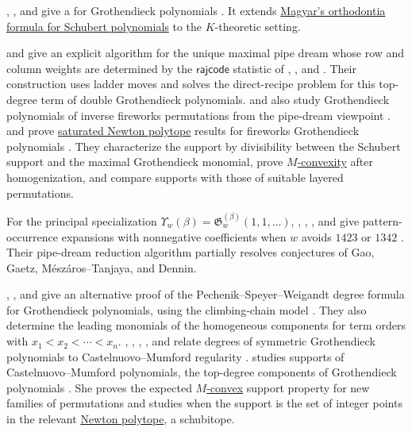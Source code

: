 , , and
 give a
\label{grothendieckOrthodontia}
for Grothendieck polynomials \cite{MeszarosSetiabrataDizier2020x}.  It extends
\hyperref[schubertOrthodontia]{Magyar's orthodontia formula for Schubert
polynomials} to the $K$-theoretic setting.

 and  give an explicit algorithm for the
unique maximal pipe dream whose row and column weights are determined by the
$\mathsf{rajcode}$ statistic of ,
, and  \cite{ChouYu2023x}.  Their
construction uses ladder moves and solves the direct-recipe problem for this
top-degree term of double Grothendieck polynomials.
 and  also study Grothendieck polynomials
of inverse fireworks permutations from the pipe-dream viewpoint
\cite{ChouYu2024x}.
 and  prove
\hyperref[newtonPolytope]{saturated Newton polytope} results for fireworks
Grothendieck polynomials \cite{ChouSetiabrata2025x}.
They characterize the support by divisibility between the Schubert support and
the maximal Grothendieck monomial, prove
\hyperref[MConvexity]{$M$-convexity} after homogenization,
and compare supports with those of suitable layered permutations.

For the principal specialization
$\Upsilon_w(\beta)=\mathfrak G_w^{(\beta)}(1,1,\dotsc)$,
, , , and
 give pattern-occurrence expansions with nonnegative
coefficients when $w$ avoids $1423$ or $1342$ \cite{BaiGuGuoLiu2026x}.
Their pipe-dream reduction algorithm partially resolves conjectures of Gao,
Gaetz, Mészáros--Tanjaya, and Dennin.

, , and
 give an alternative proof of the
Pechenik--Speyer--Weigandt degree formula for Grothendieck polynomials, using
the climbing-chain model \cite{DreyerMeszarosDizier2024}.  They also determine
the leading monomials of the homogeneous components for term orders with
$x_1 < x_2 < \dotsb < x_n$.
, , ,
, and  relate
degrees of symmetric Grothendieck polynomials to Castelnuovo--Mumford
regularity \cite{RajchgotRenRobichauxDizierWeigandt2021}.
 studies supports of Castelnuovo--Mumford polynomials,
the top-degree components of Grothendieck polynomials
\cite{Hafner2026x}.  She proves the expected \hyperref[MConvexity]{$M$-convex}
support property for
new families of permutations and studies when the support is the set of
integer points in the relevant \hyperref[newtonPolytope]{Newton polytope},
a schubitope.

